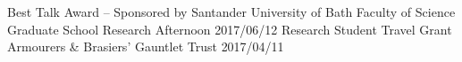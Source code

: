 \begin{cvpubs}
  \cvpub
    {Best Talk Award -- Sponsored by Santander}
    {University of Bath Faculty of Science Graduate School Research Afternoon}
    {2017/06/12}
  \cvpub
  	{Research Student Travel Grant}
    {Armourers \& Brasiers' Gauntlet Trust}
    {2017/04/11}
\end{cvpubs}



